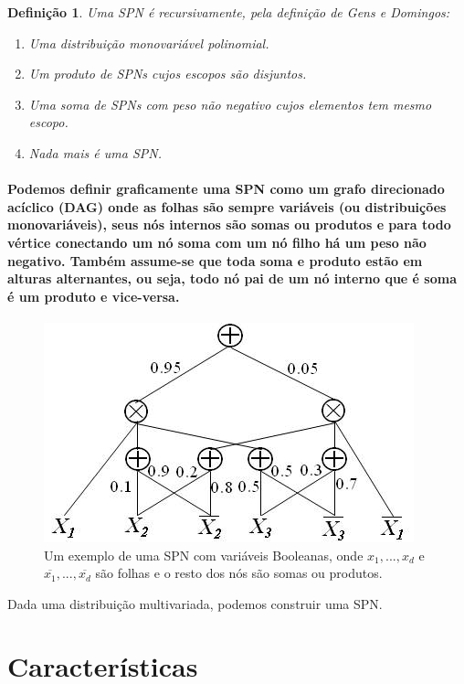 \documentclass[a4paper,10pt]{article}
\theoremstyle{plain}
\newtheorem*{spn-def}{Definição}
\begin{document}
\begin{spn-def} Uma SPN é recursivamente, pela definição de Gens e Domingos\cite{gens-domingos}:
\begin{enumerate} \itemsep0pt
  \item Uma distribuição monovariável polinomial.
  \item Um produto de SPNs cujos escopos são disjuntos.
  \item Uma soma de SPNs com peso não negativo cujos elementos tem mesmo escopo.
  \item Nada mais é uma SPN.
\end{enumerate}
\end{spn-def}

\paragraph{
  Podemos definir graficamente uma SPN como um grafo direcionado acíclico (DAG) onde as 
folhas são sempre variáveis (ou distribuições monovariáveis), seus nós internos são somas ou 
produtos e para todo vértice conectando um nó soma com um nó filho há um peso não negativo. 
Também assume-se que toda soma e produto estão em alturas alternantes, ou seja, todo nó pai 
de um nó interno que é soma é um produto e vice-versa.
}

\begin{figure}[h]
\centering\includegraphics[scale=0.7]{imgs/domingos_poon.jpg}
\caption{Um exemplo de uma SPN com variáveis Booleanas, onde $x_1,...,x_d$ e 
  $\overline{x_1},...,\overline{x_d}$ são folhas e o resto dos nós são somas ou produtos.\cite{poon-domingos}}
\end{figure}

Dada uma distribuição multivariada, podemos construir uma SPN. 

\section{Características}
\end{document}
